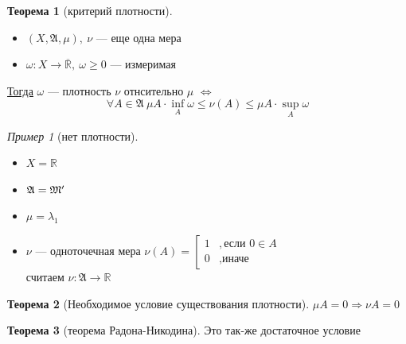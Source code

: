 \documentclass[oneside]{book}
\newcommand{\R}{\mathbb{R}}
\newcommand{\A}{\mathfrak{A}}
\theoremstyle{plain}
\theoremstyle{remark}
\newtheorem*{examp}{Пример}
\theoremstyle{definition}
\newtheorem{theorem}{Теорема}[section]
\begin{document}
\begin{theorem}[критерий плотности]
\-
\begin{itemize}
\item \((X, \A, \mu),\ \nu\) --- еще одна мера
\item \(\omega: X \to \overline{\R},\ \omega \ge 0\) --- измеримая
\end{itemize}
\uline{Тогда} \(\omega\) --- плотность \(\nu\) отнсительно \(\mu\) \(\Leftrightarrow\)
\[ \forall A \in \A\ \mu A \cdot \inf_A \omega \le \nu(A) \le \mu A \cdot \sup_A \omega \]
\end{theorem}
\begin{examp}[нет плотности]
\-
\begin{itemize}
\item \(X = \R\)
\item \(\A = \M'\)
\item \(\mu = \lambda_1\)
\item \(\nu\) --- одноточечная мера \(\nu(A) = \left[\begin{array}{ll} 1 & ,\text{если } 0 \in A \\ 0 & ,\text{иначе}\end{array}\right.\) \\
считаем \(\nu: \A \to \R\)
\end{itemize}
\end{examp}

\begin{theorem}[Необходимое условие существования плотности]
\(\mu A = 0 \Rightarrow \nu A = 0\)
\end{theorem}
\begin{theorem}[теорема Радона-Никодина]
Это так-же достаточное условие
\end{theorem}
\end{document}
